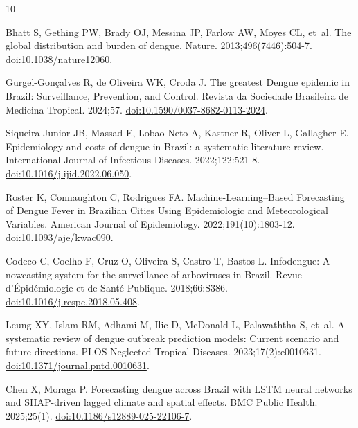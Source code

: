 \documentclass[10pt,letterpaper]{article}
\begin{document}
\begin{thebibliography}{10}

Bhatt S, Gething PW, Brady OJ, Messina JP, Farlow AW, Moyes CL, et~al.
\newblock The global distribution and burden of dengue.
\newblock Nature. 2013;496(7446):504-7.
\newblock \href {http://dx.doi.org/10.1038/nature12060}
  {doi:10.1038/nature12060}.

Gurgel-Gon{\c{c}}alves R, {de Oliveira} WK, Croda J.
\newblock The greatest Dengue epidemic in Brazil: Surveillance, Prevention, and
  Control.
\newblock Revista da Sociedade Brasileira de Medicina Tropical. 2024;57.
\newblock \href {http://dx.doi.org/10.1590/0037-8682-0113-2024}
  {doi:10.1590/0037-8682-0113-2024}.

{Siqueira Junior} JB, Massad E, Lobao-Neto A, Kastner R, Oliver L, Gallagher E.
\newblock Epidemiology and costs of dengue in Brazil: a systematic literature
  review.
\newblock International Journal of Infectious Diseases. 2022;122:521-8.
\newblock \href {http://dx.doi.org/10.1016/j.ijid.2022.06.050}
  {doi:10.1016/j.ijid.2022.06.050}.

Roster K, Connaughton C, Rodrigues FA.
\newblock Machine-Learning--Based Forecasting of Dengue Fever in Brazilian
  Cities Using Epidemiologic and Meteorological Variables.
\newblock American Journal of Epidemiology. 2022;191(10):1803-12.
\newblock \href {http://dx.doi.org/10.1093/aje/kwac090}
  {doi:10.1093/aje/kwac090}.

Codeco C, Coelho F, Cruz O, Oliveira S, Castro T, Bastos L.
\newblock Infodengue: A nowcasting system for the surveillance of arboviruses
  in Brazil.
\newblock Revue d'{\'E}pid{\'e}miologie et de Sant{\'e} Publique. 2018;66:S386.
\newblock \href {http://dx.doi.org/10.1016/j.respe.2018.05.408}
  {doi:10.1016/j.respe.2018.05.408}.

Leung XY, Islam RM, Adhami M, Ilic D, McDonald L, Palawaththa S, et~al.
\newblock A systematic review of dengue outbreak prediction models: Current
  scenario and future directions.
\newblock PLOS Neglected Tropical Diseases. 2023;17(2):e0010631.
\newblock \href {http://dx.doi.org/10.1371/journal.pntd.0010631}
  {doi:10.1371/journal.pntd.0010631}.

Chen X, Moraga P.
\newblock Forecasting dengue across Brazil with LSTM neural networks and
  SHAP-driven lagged climate and spatial effects.
\newblock BMC Public Health. 2025;25(1).
\newblock \href {http://dx.doi.org/10.1186/s12889-025-22106-7}
  {doi:10.1186/s12889-025-22106-7}.


\end{thebibliography}
\end{document}
